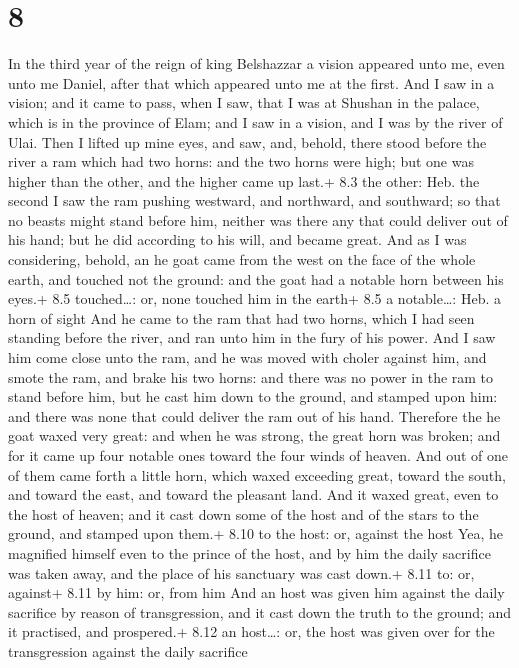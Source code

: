 \hypertarget{section-7}{%
\section{8}\label{section-7}}

 In the third year of the reign of king Belshazzar a vision
appeared unto me, even unto me Daniel, after that which appeared unto me
at the first.  And I saw in a vision; and it came to pass,
when I saw, that I was at Shushan in the palace, which is in the
province of Elam; and I saw in a vision, and I was by the river of Ulai.
 Then I lifted up mine eyes, and saw, and, behold, there
stood before the river a ram which had two horns: and the two horns were
high; but one was higher than the other, and the higher came up last.+
8.3 the other: Heb. the second  I saw the ram pushing
westward, and northward, and southward; so that no beasts might stand
before him, neither was there any that could deliver out of his hand;
but he did according to his will, and became great.  And as
I was considering, behold, an he goat came from the west on the face of
the whole earth, and touched not the ground: and the goat had a notable
horn between his eyes.+ 8.5 touched\ldots: or, none touched him in the
earth+ 8.5 a notable\ldots: Heb. a horn of sight  And he
came to the ram that had two horns, which I had seen standing before the
river, and ran unto him in the fury of his power.  And I saw
him come close unto the ram, and he was moved with choler against him,
and smote the ram, and brake his two horns: and there was no power in
the ram to stand before him, but he cast him down to the ground, and
stamped upon him: and there was none that could deliver the ram out of
his hand.  Therefore the he goat waxed very great: and when
he was strong, the great horn was broken; and for it came up four
notable ones toward the four winds of heaven.  And out of
one of them came forth a little horn, which waxed exceeding great,
toward the south, and toward the east, and toward the pleasant land.
 And it waxed great, even to the host of heaven; and it
cast down some of the host and of the stars to the ground, and stamped
upon them.+ 8.10 to the host: or, against the host  Yea, he
magnified himself even to the prince of the host, and by him the daily
sacrifice was taken away, and the place of his sanctuary was cast down.+
8.11 to: or, against+ 8.11 by him: or, from him  And an
host was given him against the daily sacrifice by reason of
transgression, and it cast down the truth to the ground; and it
practised, and prospered.+ 8.12 an host\ldots: or, the host was given
over for the transgression against the daily sacrifice

